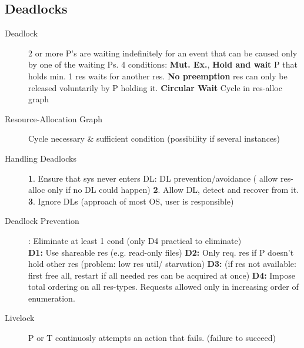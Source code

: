 \subsection*{Deadlocks}
\begin{description}
    \item[Deadlock]2 or more P's are waiting indefinitely for an event that can be caused only by one of the waiting Ps. 4 conditions: \textbf{Mut. Ex.}, \textbf{Hold and wait} P that holds min. 1 res waits for another res. \textbf{No preemption} res can only be released voluntarily by P holding it. \textbf{Circular Wait} Cycle in res-alloc graph
    \item[Resource-Allocation Graph] Cycle necessary \& sufficient condition (possibility if several instances) %
    \item[Handling Deadlocks]\textbf{1}. Ensure that sys never enters DL: DL prevention/avoidance ( allow res-alloc only if no DL could happen) \textbf{2}. Allow DL, detect and recover from it. \textbf{3}. Ignore DLs (approach of most OS, user is responsible)
    \item[Deadlock Prevention]: Eliminate at least 1 cond (only D4 practical to eliminate) \\
    \textbf{D1:} Use shareable res (e.g. read-only files) \textbf{D2:} Only req. res if P doesn’t hold other res (problem: low res util/ starvation) \textbf{D3:} (if res not available: first free all, restart if all needed res can be acquired at once) \textbf{D4:} Impose total ordering on all res-types. Requests allowed only in increasing order of enumeration.
    \item[Livelock] P or T continuosly attempts an action that fails. (failure to succeed) %
\end{description}

